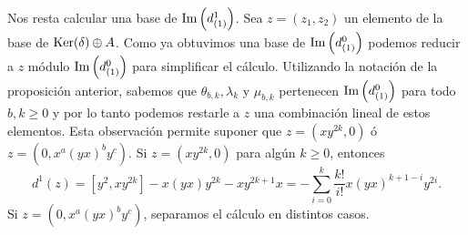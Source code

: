 \documentclass[fleqn,../tesis.tex]{subfiles}
\begin{document}
Nos resta calcular una base de $\operatorname{Im}\left(d^{1}_{(1)}\right)$. Sea $z = (z_1, z_2)$ un elemento de la base de $\operatorname{Ker}(\delta) \oplus A$.
Como ya obtuvimos una base de $\operatorname{Im}\left(d^{0}_{(1)}\right)$ podemos reducir a $z$ módulo $\operatorname{Im}\left(d^{0}_{(1)}\right)$ para simplificar el cálculo. Utilizando la notación de la proposición anterior, 
sabemos que $\theta_{b, k}, \lambda_k$ y $\mu_{b, k}$ pertenecen $\operatorname{Im}\left(d^{0}_{(1)}\right)$ para todo $b, k \geq 0$ y por lo tanto podemos
restarle a $z$ una combinación lineal de estos elementos. Esta observación permite suponer que $z = (xy^{2k}, 0)$ ó 
$z = (0, x^{a}(yx)^{b}y^{c})$. Si $z = (xy^{2k}, 0)$ para algún $k \geq 0$, entonces
\[
    d^1(z) = \left[y^{2}, xy^{2k}\right] - x(yx)y^{2k} - xy^{2k + 1}x = -\sum_{i = 0}^{k}\frac{k!}{i!}x(yx)^{k + 1- i}y^{2i}.
\]
Si $z = (0, x^{a}(yx)^{b}y^{c})$, separamos el cálculo en distintos casos.
\end{document}
